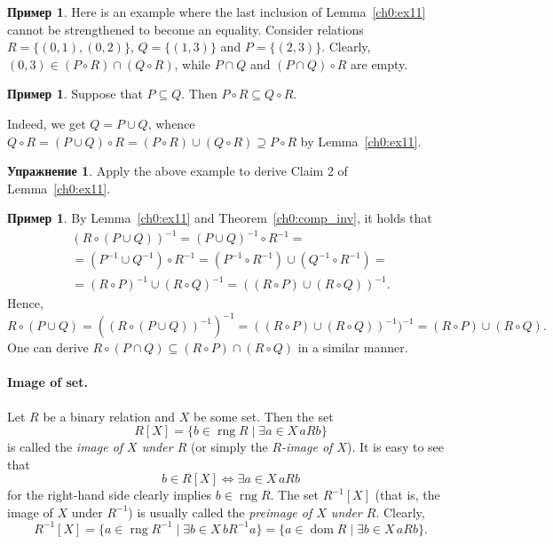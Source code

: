\documentclass[12pt,notitlepage]{article}
\theoremstyle{plain}
\theoremstyle{definition}
\newtheorem{exc}[thm]{Упражнение}
\newtheorem{exm}[thm]{Пример}
\theoremstyle{plain}
\newcommand{\sbs}{\subseteq}
\newcommand{\dom}{\mathop{\mathrm{dom}}}
\newcommand{\rng}{\mathop{\mathrm{rng}}}
\newcommand{\1}{\mathbf{1}}
\newcommand{\0}{\mathbf{0}}
\begin{document}
\begin{exm}
	Here is an example where the last inclusion of Lemma~\ref{ch0:ex11} cannot be strengthened to become an equality. Consider relations $R = \{(0,1), (0,2)\}$, $Q = \{(1,3)\}$ and $P = \{(2,3)\}$. Clearly, $(0,3) \in (P \circ R) \cap (Q \circ R)$, while $P \cap Q$ and $(P\cap Q) \circ R$ are empty.
\end{exm}

\begin{exm}
	Suppose that $P \sbs Q$. Then $P \circ R \sbs Q \circ R$.
	
	Indeed, we get $Q = P \cup Q$, whence
	$Q \circ R = (P \cup Q) \circ R = (P \circ R) \cup (Q \circ R) \supseteq P \circ R$ by Lemma~\ref{ch0:ex11}.
\end{exm}

\begin{exc}
	Apply the above example to derive Claim 2 of Lemma~\ref{ch0:ex11}.
\end{exc}


\begin{exm}\label{ch0:exm17}
	By Lemma~\ref{ch0:ex11} and Theorem~\ref{ch0:comp_inv}, it holds that
	\begin{multline*}
		(R \circ (P \cup Q))^{-1} = (P \cup Q)^{-1} \circ R^{-1} =\\
		=(P^{-1} \cup Q^{-1}) \circ R^{-1} = (P^{-1} \circ R^{-1}) \cup (Q^{-1} \circ R^{-1}) =\\
		=(R \circ P)^{-1} \cup (R \circ Q)^{-1} = ((R \circ P) \cup (R \circ Q))^{-1}.
	\end{multline*}
	Hence,
	$$
	R \circ (P \cup Q) = ((R \circ (P \cup Q))^{-1})^{-1} = ((R \circ P) \cup (R \circ Q))^{-1})^{-1} = (R \circ P) \cup (R \circ Q).
	$$
	One can derive $R \circ (P \cap Q) \sbs (R \circ P) \cap (R \circ Q)$ in a similar manner.
\end{exm}

\paragraph{Image of set.} Let $R$ be a binary relation and $X$ be some set. Then the set
$$R[X] = \{ b \in \rng R \mid \exists a \in X\, a R b \}$$
is called the \emph{image of $X$ under $R$} (or simply the \emph{$R$-image of $X$}). It is easy to see that
$$b \in R[X] \iff \exists a \in X\, a R b$$
for the right-hand side clearly implies $b \in \rng R$. The set $R^{-1}[X]$ (that is, the image of $X$ under $R^{-1}$) is usually called the \emph{preimage of $X$ under $R$}. Clearly,
$$R ^{-1}[X] = \{ a \in \rng R^{-1} \mid \exists b \in X\, b R^{-1} a \} =  \{ a \in \dom R \mid \exists b \in X\, a R b \}.$$
\end{document}
